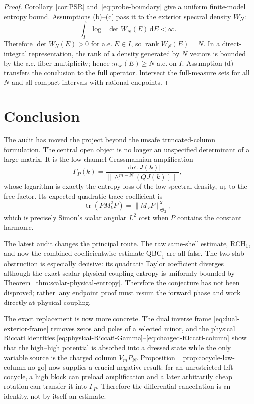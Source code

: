 \documentclass[11pt]{article}
\newcommand{\HS}{\mathfrak S_2}
\newcommand{\ac}{\mathrm{ac}}
\newcommand{\dd}{\,\mathrm d}
\DeclareMathOperator{\tr}{tr}
\DeclareMathOperator{\rank}{rank}
\theoremstyle{definition}
\theoremstyle{remark}
\begin{document}
\begin{proof}
Corollary~\ref{cor:PSR} and~\eqref{eq:probe-boundary} give a uniform finite-model entropy bound.  Assumptions (b)--(c) pass it to the exterior spectral density $W_N$:
\begin{equation}
 \int_I\log^-\det W_N(E)\dd E<\infty.
\end{equation}
Therefore $\det W_N(E)>0$ for a.e. $E\in I$, so $\rank W_N(E)=N$.  In a direct-integral representation, the rank of a density generated by $N$ vectors is bounded by the a.c. fiber multiplicity; hence $m_{\ac}(E)\geq N$ a.e. on $I$.  Assumption (d) transfers the conclusion to the full operator.  Intersect the full-measure sets for all $N$ and all compact intervals with rational endpoints.
\end{proof}

\section{Conclusion}

The audit has moved the project beyond the unsafe truncated-column formulation.  The central open object is no longer an unspecified determinant of a large matrix.  It is the low-channel Grassmannian amplification
\begin{equation}
 \Gamma_P(k)
 =\frac{|\det J(k)|}{\|\wedge^{m-N}(QJ(k))\|},
\end{equation}
whose logarithm is exactly the entropy loss of the low spectral density, up to the free factor.  Its expected quadratic trace coefficient is
\begin{equation}
 \tr(PM_V^2P)=\|M_VP\|_{\HS}^2,
\end{equation}
which is precisely Simon's scalar angular $L^2$ cost when $P$ contains the constant harmonic.

The latest audit changes the principal route.  The raw same-shell estimate,
$\mathrm{RCH}_1$, and now the combined coefficientwise estimate
$\mathrm{QBC}_1$ are all false.  The two-slab obstruction is especially
decisive: its quadratic Taylor coefficient diverges although the exact scalar
physical-coupling entropy is uniformly bounded by
Theorem~\ref{thm:scalar-physical-entropy}.  Therefore the conjecture has not
been disproved; rather, any endpoint proof must resum the forward phase and
work directly at physical coupling.

The exact replacement is now more concrete.  The dual inverse frame
\eqref{eq:dual-exterior-frame} removes zeros and poles of a selected minor,
and the physical Riccati identities
\eqref{eq:physical-Riccati-Gamma}--\eqref{eq:charged-Riccati-column} show that
the high--high potential is absorbed into a dressed state while the only
variable source is the charged column $V_mP_N$.  Proposition
~\ref{prop:cocycle-low-column-no-go} now supplies a crucial negative result:
for an unrestricted left cocycle, a high block can preload amplification and a
later arbitrarily cheap rotation can transfer it into $\Gamma_P$.  Therefore
the differential cancellation is an identity, not by itself an estimate.
\end{document}
